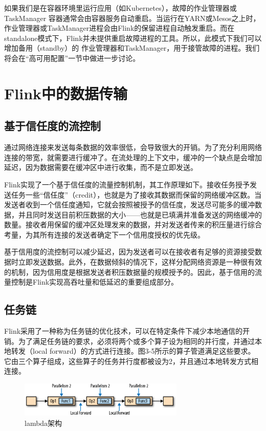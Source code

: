 \documentclass[cn,11pt,chinese]{elegantbook}
\begin{document}
如果我们是在容器环境里运行应用（如Kubernetes），故障的作业管理器或TaskManager 容器通常会由容器服务自动重启。当运行在YARN或Mesos之上时，作业管理器或TaskManager进程会由Flink的保留进程自动触发重启。而在standalone模式下，Flink并未提供重启故障进程的工具。所以，此模式下我们可以增加备用（standby）的 作业管理器和TaskManager，用于接管故障的进程。我们将会在“高可用配置”一节中做进一步讨论。

\section{Flink中的数据传输}

\subsection{基于信任度的流控制}

通过网络连接来发送每条数据的效率很低，会导致很大的开销。为了充分利用网络连接的带宽，就需要进行缓冲了。在流处理的上下文中，缓冲的一个缺点是会增加延迟，因为数据需要在缓冲区中进行收集，而不是立即发送。

Flink实现了一个基于信任度的流量控制机制，其工作原理如下。接收任务授予发送任务一些“信任度”（credit），也就是为了接收其数据而保留的网络缓冲区数。当发送者收到一个信任度通知，它就会按照被授予的信任度，发送尽可能多的缓冲数据，并且同时发送目前积压数据的大小——也就是已填满并准备发送的网络缓冲的数量。接收者用保留的缓冲区处理发来的数据，并对发送者传来的积压量进行综合考量，为其所有连接的发送者确定下一个信用度授权的优先级。

基于信用度的流控制可以减少延迟，因为发送者可以在接收者有足够的资源接受数据时立即发送数据。此外，在数据倾斜的情况下，这样分配网络资源是一种很有效的机制，因为信用度是根据发送者积压数据量的规模授予的。因此，基于信用的流量控制是Flink实现高吞吐量和低延迟的重要组成部分。

\subsection{任务链}

Flink采用了一种称为任务链的优化技术，可以在特定条件下减少本地通信的开销。为了满足任务链的要求，必须将两个或多个算子设为相同的并行度，并通过本地转发（local forward）的方式进行连接。图3-5所示的算子管道满足这些要求。它由三个算子组成，这些算子的任务并行度都被设为2，并且通过本地转发方式相连接。

\begin{figure}[htbp]
    \centering
    \includegraphics[width=0.7\textwidth]{images/spaf_0305.png}
    \caption{lambda架构}
\end{figure}
\end{document}

